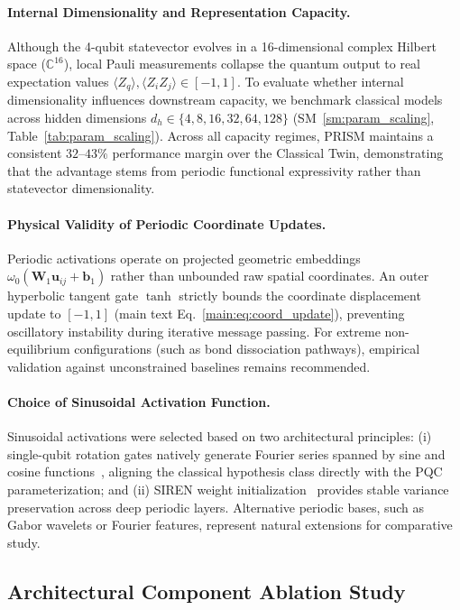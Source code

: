 \documentclass[10pt,twocolumn,letterpaper]{article}
\begin{document}
\paragraph{Internal Dimensionality and Representation Capacity.}
Although the 4-qubit statevector evolves in a 16-dimensional complex Hilbert space ($\mathbb{C}^{16}$), local Pauli measurements collapse the quantum output to real expectation values $\langle Z_q \rangle, \langle Z_i Z_j \rangle \in [-1, 1]$. To evaluate whether internal dimensionality influences downstream capacity, we benchmark classical models across hidden dimensions $d_h \in \{4, 8, 16, 32, 64, 128\}$ (SM~\ref{sm:param_scaling}, Table~\ref{tab:param_scaling}). Across all capacity regimes, PRISM maintains a consistent $32\text{--}43\%$ performance margin over the Classical Twin, demonstrating that the advantage stems from periodic functional expressivity rather than statevector dimensionality.

\paragraph{Physical Validity of Periodic Coordinate Updates.}
Periodic activations operate on projected geometric embeddings $\omega_0(\mathbf{W}_1 \mathbf{u}_{ij} + \mathbf{b}_1)$ rather than unbounded raw spatial coordinates. An outer hyperbolic tangent gate $\tanh$ strictly bounds the coordinate displacement update to $[-1, 1]$ (main text Eq.~\ref{main:eq:coord_update}), preventing oscillatory instability during iterative message passing. For extreme non-equilibrium configurations (such as bond dissociation pathways), empirical validation against unconstrained baselines remains recommended.

\paragraph{Choice of Sinusoidal Activation Function.}
Sinusoidal activations were selected based on two architectural principles: (i) single-qubit rotation gates natively generate Fourier series spanned by sine and cosine functions~\cite{Schuld:2020enb}, aligning the classical hypothesis class directly with the PQC parameterization; and (ii) SIREN weight initialization~\cite{sitzmann2020siren} provides stable variance preservation across deep periodic layers. Alternative periodic bases, such as Gabor wavelets or Fourier features, represent natural extensions for comparative study.

\subsection{Architectural Component Ablation Study}
\end{document}
